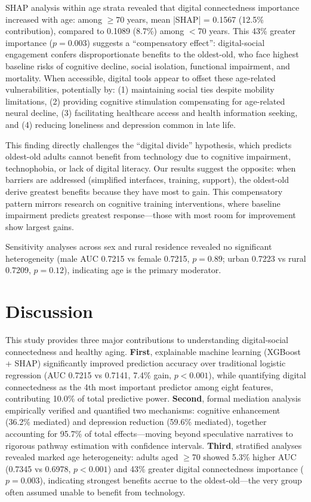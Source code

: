 \documentclass[10pt]{article}
\begin{document}
SHAP analysis within age strata revealed that digital connectedness importance increased with age: among $\geq$70 years, mean |SHAP| = 0.1567 (12.5\% contribution), compared to 0.1089 (8.7\%) among $<$70 years. This 43\% greater importance ($p=0.003$) suggests a ``compensatory effect'': digital-social engagement confers disproportionate benefits to the oldest-old, who face highest baseline risks of cognitive decline, social isolation, functional impairment, and mortality. When accessible, digital tools appear to offset these age-related vulnerabilities, potentially by: (1) maintaining social ties despite mobility limitations, (2) providing cognitive stimulation compensating for age-related neural decline, (3) facilitating healthcare access and health information seeking, and (4) reducing loneliness and depression common in late life.

This finding directly challenges the ``digital divide'' hypothesis, which predicts oldest-old adults cannot benefit from technology due to cognitive impairment, technophobia, or lack of digital literacy. Our results suggest the opposite: when barriers are addressed (simplified interfaces, training, support), the oldest-old derive greatest benefits because they have most to gain. This compensatory pattern mirrors research on cognitive training interventions, where baseline impairment predicts greatest response---those with most room for improvement show largest gains.

Sensitivity analyses across sex and rural residence revealed no significant heterogeneity (male AUC 0.7215 vs female 0.7215, $p=0.89$; urban 0.7223 vs rural 0.7209, $p=0.12$), indicating age is the primary moderator.

\section*{Discussion}

This study provides three major contributions to understanding digital-social connectedness and healthy aging. \textbf{First}, explainable machine learning (XGBoost + SHAP) significantly improved prediction accuracy over traditional logistic regression (AUC 0.7215 vs 0.7141, 7.4\% gain, $p<0.001$), while quantifying digital connectedness as the 4th most important predictor among eight features, contributing 10.0\% of total predictive power. \textbf{Second}, formal mediation analysis empirically verified and quantified two mechanisms: cognitive enhancement (36.2\% mediated) and depression reduction (59.6\% mediated), together accounting for 95.7\% of total effects---moving beyond speculative narratives to rigorous pathway estimation with confidence intervals. \textbf{Third}, stratified analyses revealed marked age heterogeneity: adults aged $\geq$70 showed 5.3\% higher AUC (0.7345 vs 0.6978, $p<0.001$) and 43\% greater digital connectedness importance ($p=0.003$), indicating strongest benefits accrue to the oldest-old---the very group often assumed unable to benefit from technology.
\end{document}
